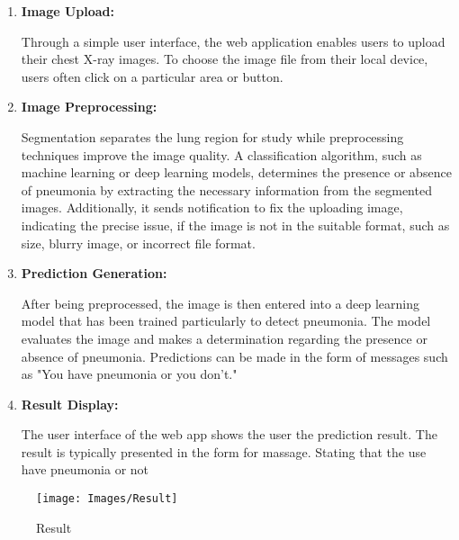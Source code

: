 \begin{enumerate}
	\item \textbf {Image Upload:}
	 
	Through a simple user interface, the web application enables users to upload their chest X-ray images.
	To choose the image file from their local device, users often click on a particular area or button.
	
	\item \textbf {Image Preprocessing:} 
	
	Segmentation separates the lung region for study while preprocessing techniques improve the image quality. A classification algorithm, such as machine learning or deep learning models, determines the presence or absence of pneumonia by extracting the necessary information from the segmented images.
	Additionally, it sends notification to fix the uploading image, indicating the precise issue, if the image is not in the suitable format, such as size, blurry image, or incorrect file format.
	
	
	\item \textbf {	Prediction Generation:}
	 
	After being preprocessed, the image is then entered into a deep learning model that has been trained particularly to detect pneumonia.
	The model evaluates the image and makes a determination regarding the presence or absence of pneumonia.
	Predictions can be made in the form of messages such as "You have pneumonia or you don't."
	
	
	\item \textbf {	Result Display:} 
	
	The user interface of the web app shows the user the prediction result. The result is typically presented in the form for massage. Stating that the use have pneumonia or not
	

\end{enumerate}



	\begin{figure}[h!]
	\centering
	\texttt{[image: Images/Result]}
	\caption{Result}
\end{figure}